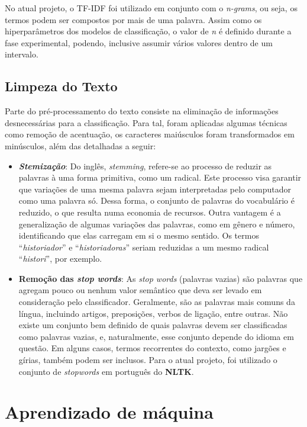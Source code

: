 No atual projeto, o TF-IDF foi utilizado em conjunto com o \textit{n-grams}, ou seja, os termos podem ser compostos por mais de uma palavra. Assim como os hiperparâmetros dos modelos de classificação, o valor de \textit{n} é definido durante a fase experimental, podendo, inclusive assumir vários valores dentro de um intervalo.

\subsection{Limpeza do Texto}

Parte do pré-processamento do texto consiste na eliminação de informações desnecessárias para a classificação. Para tal, foram aplicadas algumas técnicas como remoção de acentuação, os caracteres maiúsculos foram transformados em minúsculos, além das detalhadas a seguir:

\begin{itemize}
\item \textbf{\textit{Stemização}}: Do inglês, \textit{stemming}, refere-se ao processo de reduzir as palavras à uma forma primitiva, como um radical. Este processo visa garantir que variações de uma mesma palavra sejam interpretadas pelo computador como uma palavra só. Dessa forma, o conjunto de palavras do vocabulário é reduzido, o que resulta numa economia de recursos. Outra vantagem é a generalização de algumas variações das palavras, como em gênero e número, identificando que elas carregam em si o mesmo sentido. Os termos “\textit{historiador}” e “\textit{historiadoras}” seriam reduzidas a um mesmo radical “\textit{histori}”, por exemplo.

\item \textbf{Remoção das \textit{stop words}}: As \textit{stop words} (palavras vazias) são palavras que agregam pouco ou nenhum valor semântico que deva ser levado em consideração pelo classificador. Geralmente, são as palavras mais comuns da língua, incluindo artigos, preposições, verbos de ligação, entre outras. Não existe um conjunto bem definido de quais palavras devem ser classificadas como palavras vazias, e, naturalmente, esse conjunto depende do idioma em questão. Em alguns casos, termos recorrentes do contexto, como jargões e gírias, também podem ser inclusos. Para o atual projeto, foi utilizado o conjunto de \textit{stopwords} em português do \textbf{NLTK}.
\end{itemize}

\section{Aprendizado de máquina}

